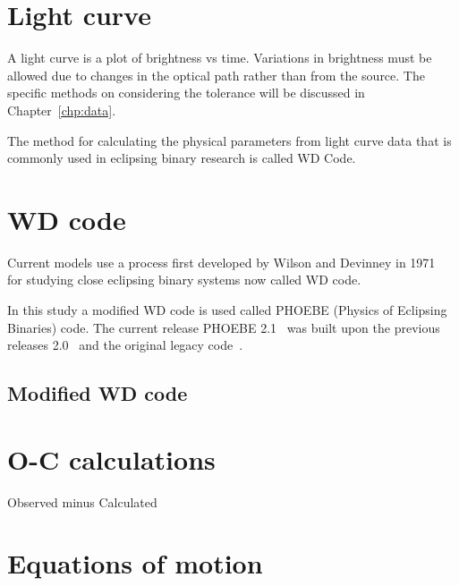 \section{Light curve}
A light curve is a plot of brightness vs time. 
Variations in brightness must be allowed due to changes in the optical path rather than
from the source.
The specific methods on considering the tolerance will be discussed in Chapter~\ref{chp:data}.

The method for calculating the physical parameters from light curve data that is commonly used in
eclipsing binary research is called WD Code.

\section{WD code}
Current models use a process first developed by Wilson and Devinney in 1971~\cite{wilson_devinney_1971}
for studying close eclipsing binary systems now called WD code.

In this study a modified WD code is used called PHOEBE (Physics of Eclipsing Binaries) code.
The current release PHOEBE 2.1~\cite{horvat_2018} was built upon the previous releases 2.0~\cite{prsa_2016}
and the original legacy code~\cite{prsa_2005}. 


\subsection{Modified WD code}


\section{O-C calculations}
Observed minus Calculated

\section{Equations of motion}



